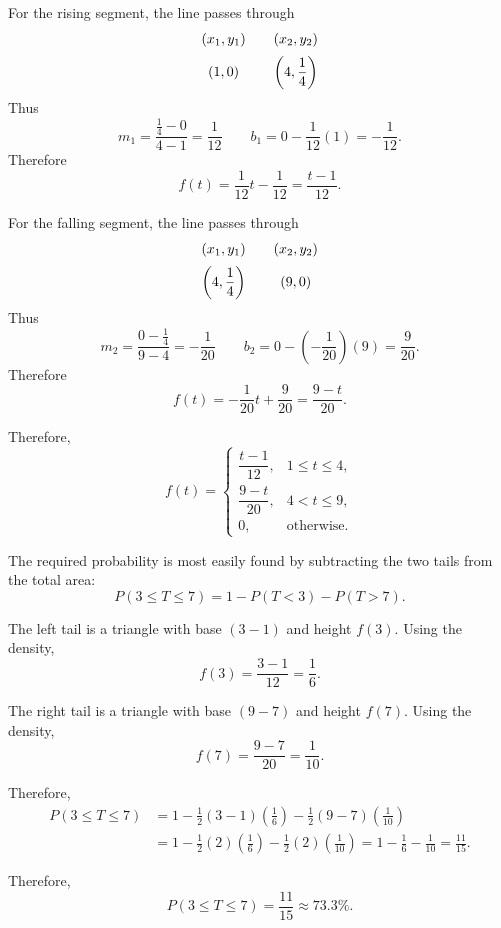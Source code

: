 {		For the rising segment, the line passes through
		\[
		\begin{array}{c@{\qquad}c}
			(x_1,y_1) & (x_2,y_2) \\[2mm]
			\left(1,0\right)
			&
			\left(4,\dfrac14\right)
		\end{array}
		\]
		Thus
		\[
		m_1
		=
		\frac{\frac14-0}{4-1}
		=
		\frac1{12}
		\qquad
		b_1
		=
		0-\frac1{12}(1)
		=
		-\frac1{12}.
		\]
		Therefore
		\[
		f(t)
		=
		\frac1{12}t-\frac1{12}
		=
		\frac{t-1}{12}.
		\]
		
		For the falling segment, the line passes through
		\[
		\begin{array}{c@{\qquad}c}
			(x_1,y_1) & (x_2,y_2) \\[2mm]
			\left(4,\dfrac14\right)
			&
			(9,0)
		\end{array}
		\]
		Thus
		\[
		m_2
		=
		\frac{0-\frac14}{9-4}
		=
		-\frac1{20}
		\qquad
		b_2
		=
		0-\left(-\frac1{20}\right)(9)
		=
		\frac9{20}.
		\]
		Therefore
		\[
		f(t)
		=
		-\frac1{20}t+\frac9{20}
		=
		\frac{9-t}{20}.
		\]
		
		Therefore,
		\[
		f(t)=
		\begin{cases}
			\dfrac{t-1}{12},&1\le t\le4,\\[1mm]
			\dfrac{9-t}{20},&4<t\le9,\\[1mm]
			0,&\text{otherwise.}
		\end{cases}
		\]
		
		The required probability is most easily found by subtracting the two
		tails from the total area:
		\[
		P(3\le T\le7)
		=
		1-P(T<3)-P(T>7).
		\]
		
		The left tail is a triangle with base \((3-1)\) and height \(f(3)\).
		Using the density,
		\[
		f(3)
		=
		\frac{3-1}{12}
		=
		\frac16.
		\]
		
		The right tail is a triangle with base \((9-7)\) and height \(f(7)\).
		Using the density,
		\[
		f(7)
		=
		\frac{9-7}{20}
		=
		\frac1{10}.
		\]
		
		Therefore,
		\[
		\begin{aligned}
			P(3\le T\le7)
			&=
			1
			-
			\frac12(3-1)\left(\frac16\right)
			-
			\frac12(9-7)\left(\frac1{10}\right)
			\\
			& =
			1
			-
			\frac12(2)\left(\frac16\right)
			-
			\frac12(2)\left(\frac1{10}\right) =
			1-\frac16-\frac1{10} = \frac{11}{15}.
		\end{aligned}
		\]
		
		Therefore,
		\[
		\boxed{P(3\le T\le7)=\frac{11}{15}\approx73.3\%}.
		\]
		
		
		\vspace{-5mm}
		
	}
	
